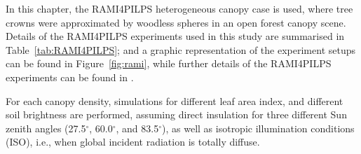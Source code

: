 \documentclass[a4paper,11pt]{report}
\begin{document}

In this chapter, the RAMI4PILPS heterogeneous canopy case is used, where tree crowns were approximated by woodless spheres in an open forest canopy scene. Details of the RAMI4PILPS experiments used in this study are summarised in Table~\ref{tab:RAMI4PILPS}; and a graphic representation of the experiment setups can be found in Figure~\ref{fig:rami}, while further details of the RAMI4PILPS experiments can be found in \citet{Widlowski2011}.

For each canopy density, simulations for different leaf area index, and different soil brightness are performed, assuming direct insulation for three different Sun zenith angles (27.5$^{\circ}$, 60.0$^{\circ}$, and 83.5$^{\circ}$), as well as isotropic illumination conditions (ISO), i.e., when global incident radiation is totally diffuse.

\end{document}
